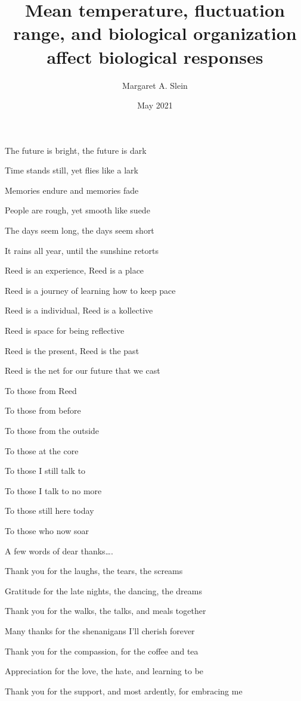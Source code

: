 \documentclass[12pt,twoside]{reedthesis}
\title{Mean temperature, fluctuation range, and biological organization affect biological responses}
\author{Margaret A. Slein}
\date{May 2021}
\begin{document}
  \maketitle

\frontmatter %
\pagestyle{empty} %
  \begin{acknowledgements}
    The future is bright, the future is dark
    
    Time stands still, yet flies like a lark
    
    Memories endure and memories fade
    
    People are rough, yet smooth like suede
    
    The days seem long, the days seem short
    
    It rains all year, until the sunshine retorts
    
    Reed is an experience, Reed is a place
    
    Reed is a journey of learning how to keep pace
    
    Reed is a individual, Reed is a kollective
    
    Reed is space for being reflective
    
    Reed is the present, Reed is the past
    
    Reed is the net for our future that we cast
    
    To those from Reed
    
    To those from before
    
    To those from the outside
    
    To those at the core
    
    To those I still talk to
    
    To those I talk to no more
    
    To those still here today
    
    To those who now soar
    
    A few words of dear thanks\ldots{}.
    
    Thank you for the laughs, the tears, the screams
    
    Gratitude for the late nights, the dancing, the dreams
    
    Thank you for the walks, the talks, and meals together
    
    Many thanks for the shenanigans I'll cherish forever
    
    Thank you for the compassion, for the coffee and tea
    
    Appreciation for the love, the hate, and learning to be
    
    Thank you for the support, and most ardently, for embracing me
  \end{acknowledgements}
\end{document}
